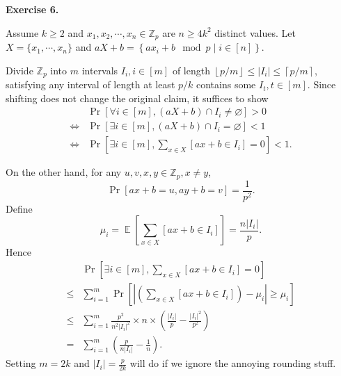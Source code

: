 \documentclass[a4paper]{article}
\newenvironment{exercise}[1]{
	\par
	\noindent\textbf{Exercise #1.}\quad
}{
	\par
	\bigskip
}
\DeclareMathOperator{\E}{\mathbb E}
\newcommand{\abs}[1]{\left| #1 \right|}
\newcommand{\pbra}[1]{\left( #1 \right)}
\newcommand{\cbra}[1]{\left\{ #1 \right\}}
\newcommand{\sbra}[1]{\left[ #1 \right]}
\newcommand{\floorbra}[1]{\left\lfloor #1 \right\rfloor}
\newcommand{\ceilbra}[1]{\left\lceil #1 \right\rceil}
\newcommand{\Zbb}{\mathbb{Z}}
\begin{document}
\begin{exercise}{6}
    Assume $k\geq2$ and $x_1,x_2,\cdots,x_n\in\Zbb_p$ are $n\geq4k^2$ distinct values.
    Let $X=\{x_1,\cdots,x_n\}$ and $aX+b=\cbra{ax_i+b\mod p\middle|i\in[n]}$.

    Divide $\Zbb_p$ into $m$ intervals $I_i,i\in[m]$ of length $\floorbra{p/m}\leq|I_i|\leq\ceilbra{p/m}$,
    satisfying any interval of length at least $p/k$ contains some $I_t,t\in[m]$.
    Since shifting does not change the original claim, it suffices to show
    \begin{align*}
        &\Pr\sbra{\forall i\in[m],(aX+b)\cap I_i\neq\varnothing}>0\\
        \iff&\Pr\sbra{\exists i\in[m],(aX+b)\cap I_i=\varnothing}<1\\
        \iff&\Pr\sbra{\exists i\in[m],\sum_{x\in X}[ax+b\in I_i]=0}<1.
    \end{align*}

    On the other hand, for any $u,v,x,y\in\Zbb_p,x\neq y$, 
    $$
    \Pr\sbra{ax+b=u,ay+b=v}=\frac1{p^2}.
    $$
    Define 
    $$
    \mu_i=\E\sbra{\sum_{x\in X}[ax+b\in I_i]}=\frac{n|I_i|}p.
    $$
    Hence
    \begin{align*}
        &\Pr\sbra{\exists i\in[m],\sum_{x\in X}[ax+b\in I_i]=0}\\
        \leq&\sum_{i=1}^m\Pr\sbra{\abs{\pbra{\sum_{x\in X}[ax+b\in I_i]}-\mu_i}\geq\mu_i}\\
        \leq&\sum_{i=1}^m\frac{p^2}{n^2|I_i|^2}\times n\times\pbra{\frac{|I_i|}p-\frac{|I_i|^2}{p^2}}\\
        =&\sum_{i=1}^m\pbra{\frac p{n|I_i|}-\frac1n}.
    \end{align*}
    Setting $m=2k$ and $|I_i|=\frac p{2k}$ will do if we ignore the annoying rounding stuff.
\end{exercise}
\end{document}
